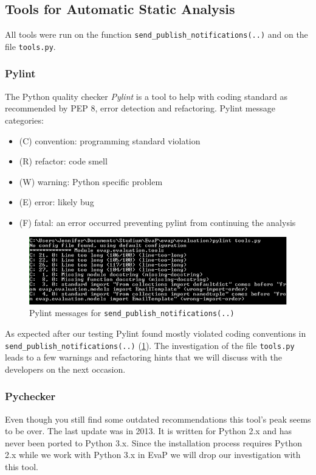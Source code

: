 \subsection{Tools for Automatic Static Analysis}
All tools were run on the function \texttt{send\_publish\_notifications(..)} and on the file \texttt{tools.py}.

\subsubsection{Pylint}
The Python quality checker \emph{Pylint} is a tool to help with coding standard as recommended by PEP 8, error detection and refactoring.
Pylint message categories:
\begin{itemize}
    \item (C) convention: programming standard violation
    \item (R) refactor: code smell
    \item (W) warning: Python specific problem
    \item (E) error: likely bug
    \item (F) fatal: an error occurred preventing pylint from continuing the analysis
\end{itemize}
\begin{figure}[h]
    \centering
    \includegraphics[width=\textwidth, keepaspectratio]{graphics/pylint_send_publish_notifications_1}
    \caption{Pylint messages for \texttt{send\_publish\_notifications(..)}}
    \label{fig:pylint}
\end{figure} 
As expected after our testing Pylint found mostly violated coding conventions in \texttt{send\_publish\_notifications(..)} (\ref{fig:pylint}).
The investigation of the file \texttt{tools.py} leads to a few warnings and refactoring hints that we will discuss with the developers on the next occasion.


\subsubsection{Pychecker}
Even though you still find some outdated recommendations this tool's peak seems to be over. 
The last update was in 2013.
It is written for Python 2.x and has never been ported to Python 3.x.
Since the installation process requires Python 2.x while we work with Python 3.x in EvaP we will drop our investigation with this tool.

